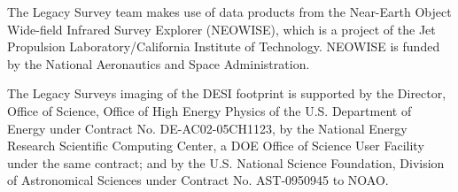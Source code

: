 \documentclass[twocolumn]{aastex631}
\begin{document}
The Legacy Survey team makes use of data products from the Near-Earth Object Wide-field Infrared Survey Explorer (NEOWISE), which is a project of the Jet Propulsion Laboratory/California Institute of Technology. NEOWISE is funded by the National Aeronautics and Space Administration.

The Legacy Surveys imaging of the DESI footprint is supported by the Director, Office of Science, Office of High Energy Physics of the U.S. Department of Energy under Contract No. DE-AC02-05CH1123, by the National Energy Research Scientific Computing Center, a DOE Office of Science User Facility under the same contract; and by the U.S. National Science Foundation, Division of Astronomical Sciences under Contract No. AST-0950945 to NOAO.

{}

\end{document}
